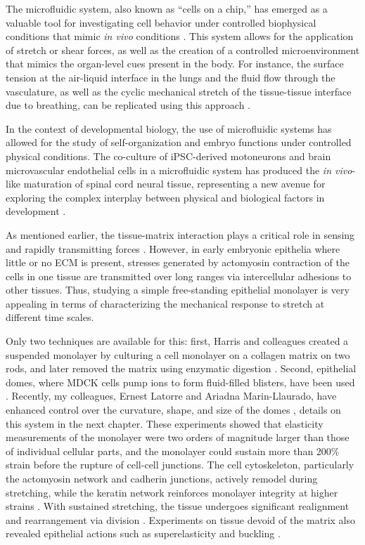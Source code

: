 The microfluidic system, also known as ``cells on a chip,'' has emerged as a valuable tool for investigating cell behavior under controlled biophysical conditions that mimic \textit{in vivo} conditions \cite{ingber2018}. This
system allows for the application of stretch or shear forces, as well as the creation of a controlled microenvironment that mimics the organ-level cues present in the body. For instance, the surface tension at the air-liquid interface in the lungs and the fluid flow through the vasculature, as well as the cyclic mechanical stretch of the tissue-tissue interface due to breathing, can be replicated using this approach \cite{huh2010}.

In the context of developmental biology, the use of microfluidic systems has allowed for the study of self-organization and embryo functions under controlled physical conditions. The co-culture of iPSC-derived motoneurons and brain microvascular endothelial cells in a microfluidic system has produced the \textit{in vivo}-like maturation of spinal cord neural tissue, representing a new avenue for exploring the complex interplay between physical and biological factors in development \cite{sances2018, samal2019}.

As mentioned earlier, the tissue-matrix interaction plays a critical role in sensing and rapidly transmitting forces \cite{tambe2011, sunyer2016, serra-picamal2012}. However, in early embryonic epithelia where little or no ECM is present, stresses generated by actomyosin contraction of the cells in one tissue are transmitted over long ranges via intercellular adhesions to other tissues. Thus, studying a simple free-standing epithelial monolayer is very appealing in terms of characterizing the mechanical response to stretch at different time scales.

Only two techniques are available for this: first, Harris and colleagues created a suspended monolayer by culturing a cell monolayer on a collagen matrix on two rods, and later removed the matrix using enzymatic digestion \cite{harris2012}. Second, epithelial domes, where MDCK cells pump ions to form fluid-filled blisters, have been used \cite{lever1979}. Recently, my colleagues, Ernest Latorre and Ariadna Marin-Llaurado, have enhanced control over the curvature, shape, and size of the domes \cite{latorre2018, marin-llaurado2022}, details on this system in the next chapter. These experiments showed that elasticity measurements of the monolayer were two orders of magnitude larger than those of individual cellular parts, and the monolayer could sustain more than 200\% strain before the rupture of cell-cell junctions. The cell cytoskeleton, particularly the actomyosin network and cadherin junctions, actively remodel during stretching, while the keratin network reinforces monolayer integrity at higher strains \cite{latorre2018, duque2023}. With sustained stretching, the tissue undergoes significant realignment and rearrangement via division \cite{wyatt2015}. Experiments on tissue devoid of the matrix also revealed epithelial actions such as superelasticity and buckling \cite{latorre2018, wyatt2020}.

